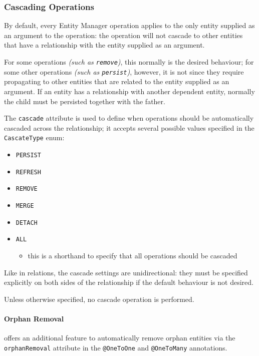 \documentclass[english]{article}
\begin{document}
\subsubsection{Cascading Operations}

By default, every Entity Manager operation applies to the only entity supplied as an argument to the operation:
the operation will not cascade to other entities that have a relationship with the entity supplied as an argument.

For some operations \textit{(such as \texttt{remove})}, this normally is the desired behaviour;
for some other operations \textit{(such as \texttt{persist})}, however, it is not since they require propagating to other entities that are related to the entity supplied as an argument.
If an entity has a relationship with another dependent entity, normally the child must be persisted together with the father.

The \texttt{cascade} attribute is used to define when operations should be automatically cascaded across the relationship;
it accepts several possible values specified in the \texttt{CascateType} enum:

\begin{itemize}[label=\texttt{>}]
  \item \texttt{PERSIST}
  \item \texttt{REFRESH}
  \item \texttt{REMOVE}
  \item \texttt{MERGE}
  \item \texttt{DETACH}
  \item \texttt{ALL}
        \begin{itemize}[label=\(\rightarrow\)]
          \item this is a shorthand to specify that all operations should be cascaded
        \end{itemize}
\end{itemize}

Like in relations, the cascade settings are unidirectional: they must be specified explicitly on both sides of the relationship if the default behaviour is not desired.

Unless otherwise specified, no cascade operation is performed.

\paragraph{Orphan Removal}

\jpa offers an additional feature to automatically remove orphan entities via the \texttt{orphanRemoval} attribute in the \texttt{@OneToOne} and \texttt{@OneToMany} annotations.
\end{document}
